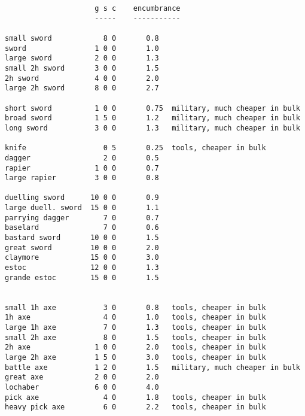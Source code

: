 \small
\begin{verbatim}
                     g s c    encumbrance
                     -----    -----------

small sword            8 0       0.8
sword                1 0 0       1.0
large sword          2 0 0       1.3
small 2h sword       3 0 0       1.5
2h sword             4 0 0       2.0
large 2h sword       8 0 0       2.7

short sword          1 0 0       0.75  military, much cheaper in bulk
broad sword          1 5 0       1.2   military, much cheaper in bulk
long sword           3 0 0       1.3   military, much cheaper in bulk

knife                  0 5       0.25  tools, cheaper in bulk
dagger                 2 0       0.5
rapier               1 0 0       0.7
large rapier         3 0 0       0.8

duelling sword      10 0 0       0.9
large duell. sword  15 0 0       1.1
parrying dagger        7 0       0.7
baselard               7 0       0.6
bastard sword       10 0 0       1.5
great sword         10 0 0       2.0
claymore            15 0 0       3.0
estoc               12 0 0       1.3
grande estoc        15 0 0       1.5


small 1h axe           3 0       0.8   tools, cheaper in bulk
1h axe                 4 0       1.0   tools, cheaper in bulk
large 1h axe           7 0       1.3   tools, cheaper in bulk
small 2h axe           8 0       1.5   tools, cheaper in bulk
2h axe               1 0 0       2.0   tools, cheaper in bulk
large 2h axe         1 5 0       3.0   tools, cheaper in bulk
battle axe           1 2 0       1.5   military, much cheaper in bulk
great axe            2 0 0       2.0
lochaber             6 0 0       4.0
pick axe               4 0       1.8   tools, cheaper in bulk
heavy pick axe         6 0       2.2   tools, cheaper in bulk
\end{verbatim} \normalsize
\pagebreak[1]
